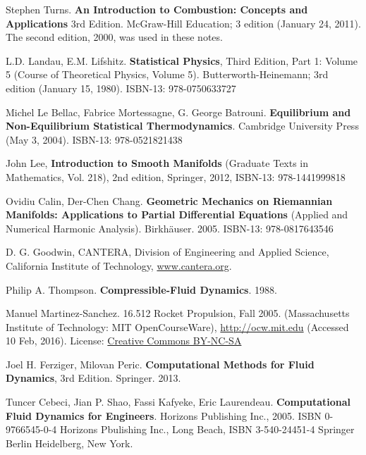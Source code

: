 \documentclass[10pt]{amsart}
\begin{document}
\begin{thebibliography}{9}
Stephen Turns. \textbf{An Introduction to Combustion: Concepts and Applications} 3rd Edition.  McGraw-Hill Education; 3 edition (January 24, 2011).  The second edition, 2000, was used in these notes.  

L.D. Landau, E.M. Lifshitz.  \textbf{Statistical Physics}, Third Edition, Part 1: Volume 5 (Course of Theoretical Physics, Volume 5). Butterworth-Heinemann; 3rd edition (January 15, 1980).  ISBN-13: 978-0750633727


Michel Le Bellac, Fabrice Mortessagne, G. George Batrouni.  \textbf{Equilibrium and Non-Equilibrium Statistical Thermodynamics}.  Cambridge University Press (May 3, 2004).  ISBN-13: 978-0521821438


John Lee, \textbf{Introduction to Smooth Manifolds} (Graduate Texts in Mathematics, Vol. 218), 2nd edition, Springer,  2012, ISBN-13: 978-1441999818

Ovidiu Calin, Der-Chen Chang. \textbf{Geometric Mechanics on Riemannian Manifolds: Applications to Partial Differential Equations} (Applied and Numerical Harmonic Analysis).  Birkh\"{a}user. 2005. ISBN-13: 978-0817643546




D. G. Goodwin, CANTERA, Division of Engineering and Applied Science, California Institute of Technology,
\url{www.cantera.org}.

Philip A. Thompson.  \textbf{Compressible-Fluid Dynamics}.  1988.

Manuel Martinez-Sanchez. 16.512 Rocket Propulsion, Fall 2005. (Massachusetts Institute of Technology: MIT OpenCourseWare), \href{http://ocw.mit.edu/courses/aeronautics-and-astronautics/16-512-rocket-propulsion-fall-2005}{http://ocw.mit.edu} (Accessed 10 Feb, 2016). License: \href{http://creativecommons.org/licenses/by-nc-sa/4.0/}{Creative Commons BY-NC-SA}


 Joel H. Ferziger, Milovan Peric.  \textbf{Computational Methods for Fluid Dynamics}, 3rd Edition.  Springer.  2013.  

 Tuncer Cebeci, Jian P. Shao, Fassi Kafyeke, Eric Laurendeau.  \textbf{Computational Fluid Dynamics for Engineers}.  Horizons Publishing Inc., 2005.  ISBN 0-9766545-0-4 Horizons Pbulishing Inc., Long Beach, ISBN 3-540-24451-4 Springer Berlin Heidelberg, New York.  
  



\end{thebibliography}
\end{document}
